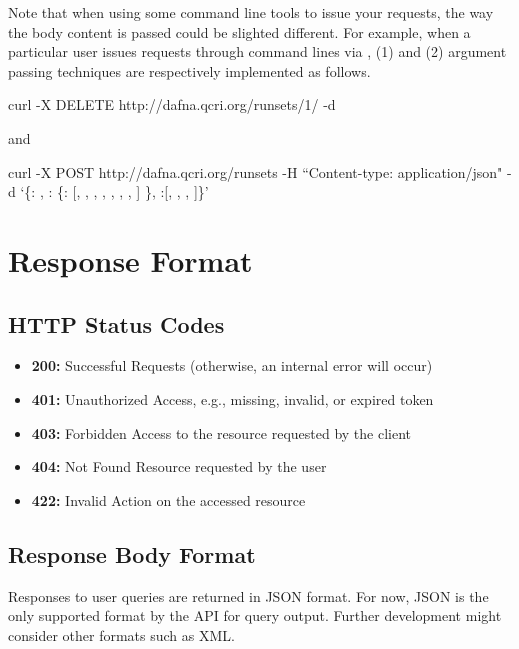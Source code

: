 \documentclass[a4paper,10pt]{scrartcl}
\begin{document}
Note that when using some command line tools to issue your requests, the way the body content is passed could be slighted different.
For example, when a particular user issues requests through command lines via
\href{http://curl.haxx.se/}{}, (1) and (2) argument passing techniques are respectively implemented as follows.
\begin{description}
 \item curl -X DELETE http://dafna.qcri.org/runsets/1/ -d \\
 \item and \\
 \item curl -X POST http://dafna.qcri.org/runsets -H ``Content-type: application/json" -d `\{:  , : \{: [, , , , , , , ] \}, :[, , , ]\}' 
\end{description}
\section{Response Format}
\subsection{HTTP Status Codes}
\begin{itemize}
 \item \textbf{200:} Successful Requests (otherwise, an internal error will occur)
 \item \textbf{401:} Unauthorized Access, e.g., missing, invalid, or expired token
 \item \textbf{403:} Forbidden Access to the resource requested by the client
 \item \textbf{404:} Not Found Resource requested by the user
 \item \textbf{422:} Invalid Action on the accessed resource
 
\end{itemize}

\subsection{Response Body Format}
Responses to user queries are returned in JSON format. For now, JSON is the only supported format by the API for query output.
Further development might consider other formats such as XML.
\end{document}
